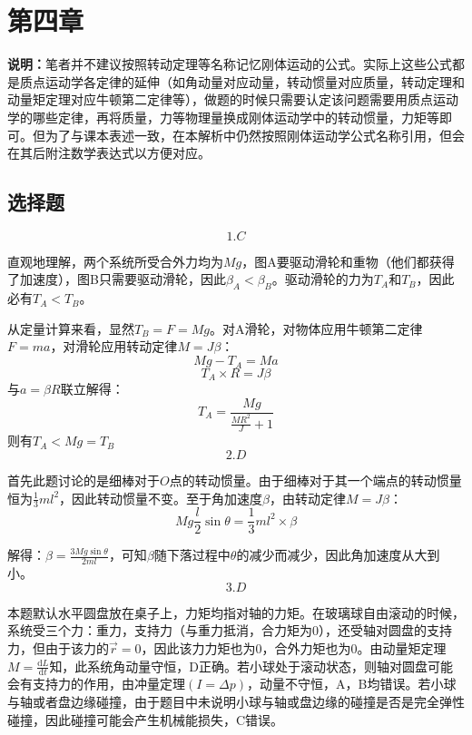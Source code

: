 \documentclass[blue, pad]{./templete/qyxfnote}
\newcommand{\di}[1]{\mathrm{d}#1}
\newcommand{\dy}[2]{\frac{\di{#1}}{\di{#2}}}
\begin{document}
	\section{第四章}
	\begin{note}
		\noindent\textbf{\Large 说明：}笔者并不建议按照转动定理等名称记忆刚体运动的公式。实际上这些公式都是质点运动学各定律的延伸（如角动量对应动量，转动惯量对应质量，转动定理和动量矩定理对应牛顿第二定律等），做题的时候只需要认定该问题需要用质点运动学的哪些定律，再将质量，力等物理量换成刚体运动学中的转动惯量，力矩等即可。但为了与课本表述一致，在本解析中仍然按照刚体运动学公式名称引用，但会在其后附注数学表达式以方便对应。
	\end{note}
		\subsection{选择题}
			\[1.C\]\par
			直观地理解，两个系统所受合外力均为$ Mg $，图A要驱动滑轮和重物（他们都获得了加速度），图B只需要驱动滑轮，因此$ \beta_A<\beta_B $。驱动滑轮的力为$ T_A $和$ T_B $，因此必有$ T_A<T_B $。\par
			从定量计算来看，显然$ T_B=F=Mg $。对A滑轮，对物体应用牛顿第二定律$F=ma$，对滑轮应用转动定律$M=J\beta$：
			\[Mg-T_A=Ma\]
			\[T_A\times R=J\beta\]
			与$ a=\beta R $联立解得：
			\[T_A=\frac{Mg}{\frac{MR^2}{J}+1}\]
			则有$ T_A< Mg=T_B$
			\[2.D\]\par
			\par
			首先此题讨论的是细棒对于$ O $点的转动惯量。由于细棒对于其一个端点的转动惯量恒为$ \frac{1}{3}ml^2 $，因此转动惯量不变。至于角加速度$ \beta $，由转动定律$M=J\beta$：
			\[Mg\frac{l}{2}\sin\theta=\frac{1}{3}ml^2\times\beta\]\par
			解得：$ \beta=\frac{3Mg\sin\theta}{2ml} $，可知$ \beta $随下落过程中$ \theta $的减少而减少，因此角加速度从大到小。
			\[3.D\]\par
			本题默认水平圆盘放在桌子上，力矩均指对轴的力矩。在玻璃球自由滚动的时候，系统受三个力：重力，支持力（与重力抵消，合力矩为0），还受轴对圆盘的支持力，但由于该力的$ \vec{r}=0 $，因此该力力矩也为0，合外力矩也为0。由动量矩定理$ M=\dy{L}{t} $知，此系统角动量守恒，D正确。若小球处于滚动状态，则轴对圆盘可能会有支持力的作用，由冲量定理$ (I=\Delta p) $，动量不守恒，A，B均错误。若小球与轴或者盘边缘碰撞，由于题目中未说明小球与轴或盘边缘的碰撞是否是完全弹性碰撞，因此碰撞可能会产生机械能损失，C错误。\\
\end{document}
